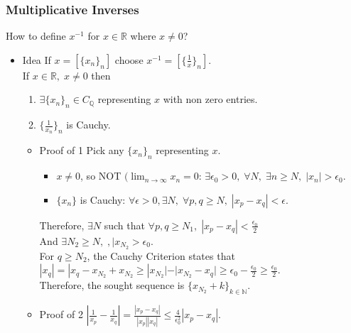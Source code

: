 \documentclass[11pt]{article}
\newcommand{\0}{\emptyset}
\newcommand{\N}{\mathbb{N}}
\newcommand{\Q}{\mathbb{Q}}
\newcommand{\R}{\mathbb{R}}
\begin{document}
\subsubsection*{Multiplicative Inverses}
\label{sec:orga1e1dca}
How to define \(x^{-1}\) for \(x\in\R\) where \(x\neq 0\)?\\[0pt]
\begin{itemize}
\item Idea
\label{sec:org8db90cb}
If \(x=[\{x_{n}\}_{n}]\) choose \(x^{-1}=[\{\frac{1}{x} \}_{n}]\).\\[0pt]
If \(x\in\R,\;x\neq0\) then\\[0pt]
\begin{enumerate}
\item \(\exists \{x_{n}\}_{n}\in C_{\Q}\) representing \(x\) with non zero entries.\\[0pt]
\item \(\{\frac{1}{x_{n}}\}_{n}\) is Cauchy.\\[0pt]
\end{enumerate}
\begin{itemize}
\item Proof of 1
\label{sec:org5330e36}
Pick any \(\{x_{n}\}_{n}\) representing \(x\).\\[0pt]
\begin{itemize}
\item \(x\neq 0\), so NOT \((\lim_{n\to\infty}x_{n}=0\): \(\exists \epsilon_{0}>0,\;\forall N,\;\exists n\geq N,\;|x_{n}|>\epsilon_{0}\).\\[0pt]
\item \(\{x_{n}\}\) is Cauchy: \(\forall\epsilon>0,\exists N,\;\forall p,q\geq N,\;|x_{p}-x_{q}|<\epsilon\).\\[0pt]
\end{itemize}
Therefore, \(\exists N\) such that \(\forall p,q\geq N_{1},\;|x_{p}-x_{q}|<\frac{\epsilon_{0}}{2}\)\\[0pt]
And \(\exists N_{2}\geq N,\;,|x_{N_{2}}>\epsilon_{0}\).\\[0pt]
For \(q\geq N_{2}\), the Cauchy Criterion states that \(|x_{q}|=|x_{q}-x_{N_{2}}+x_{N_{2}}\geq|x_{N_{2}}|-|x_{N_{2}}-x_{q}|\geq \epsilon_{0}-\frac{\epsilon_{0}}{2}\geq\frac{\epsilon_{0}}{2}\).\\[0pt]
Therefore, the sought sequence is \(\{x_{N_{2}}+k\}_{k\in\N}\).\\[0pt]
\item Proof of 2
\label{sec:orgd04ef4a}
\(\left| \frac{1}{x_{p}} -\frac{1}{x_{q}} \right| =\frac{|x_{p}-x_{q}|}{|x_{p}||x_{q}|}\leq\frac{4}{\epsilon_{0}^{2}} |x_{p}-x_{q}|\).\\[0pt]
\end{itemize}
\end{itemize}
\end{document}
